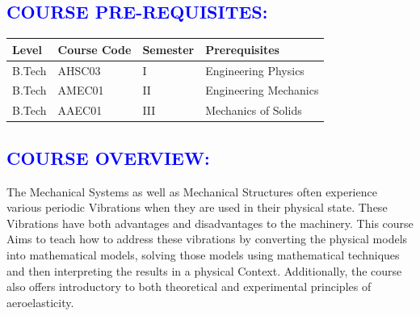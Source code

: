 \documentclass[11pt]{exam}
\begin{document}
\begin{flushleft}
\textcolor{blue}{\section{\large \bfseries COURSE PRE-REQUISITES:}}\vspace{-0.25cm}
\begin{tabular}{|>{\centering\arraybackslash}p{2cm}  | >{\centering\arraybackslash}p{4cm}  |   >{\centering\arraybackslash}p{2.2cm} |>{\centering\arraybackslash}p{7cm}|} 
	\hline 		
	\textbf{Level}&	\textbf{Course Code}&	\textbf{Semester}&	\textbf{Prerequisites}\\ 
	\hline
	B.Tech&	AHSC03&	I&Engineering Physics\\ 
	\hline
	B.Tech&	AMEC01&	II&Engineering Mechanics\\ 
	\hline
	B.Tech&	AAEC01&	III&Mechanics of Solids\\ 
	\hline
\end{tabular}\end{flushleft}

\textcolor{blue}{\section{\large \bfseries COURSE OVERVIEW:}}\vspace{-0.25cm}
The Mechanical Systems as well as Mechanical Structures often experience various periodic Vibrations when they are used in their physical state. These Vibrations have both advantages and disadvantages to the machinery. This course Aims to teach how to address these vibrations by converting the physical models into mathematical models, solving those models using mathematical techniques and then interpreting the results in a physical Context. Additionally, the course also offers introductory to both theoretical and experimental principles of aeroelasticity.
 
\end{document}
